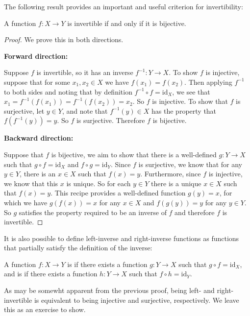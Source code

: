 The following result provides an important and useful criterion for invertibility:

\begin{theorem}
A function $f:X \to Y$ is invertible if and only if it is bijective.
\end{theorem}
\begin{proof}
We prove this in both directions.

\textbf{Forward direction:}

Suppose $f$ is invertible, so it has an inverse $f^{-1}: Y \to X$. To show $f$ is injective, suppose that for some $x_1, x_2 \in X$ we have $f(x_1) = f(x_2)$. Then applying $f^{-1}$ to both sides and noting that by definition $f^{-1} \circ f = \mathrm{id}_X$, we see that $x_1 = f^{-1}(f(x_1)) = f^{-1}(f(x_2)) = x_2$. So $f$ is injective. To show that $f$ is surjective, let $y \in Y$, and note that $f^{-1}(y) \in X$ has the property that $f(f^{-1}(y)) = y$. So $f$ is surjective. Therefore $f$ is bijective.

\textbf{Backward direction:}

Suppose that $f$ is bijective, we aim to show that there is a well-defined $g:Y \to X$ such that $g \circ f = \mathrm{id}_X$ and $f \circ g = \mathrm{id}_Y$. Since $f$ is surjective, we know that for any $y \in Y$, there is an $x \in X$ such that $f(x) = y$. Furthermore, since $f$ is injective, we know that this $x$ is unique. So for each $y \in Y$ there is a unique $x \in X$ such that $f(x) = y$. This recipe provides a well-defined function $g(y) = x$, for which we have $g(f(x)) = x$ for any $x \in X$ and $f(g(y)) = y$ for any $y \in Y$. So $g$ satisfies the property required to be an inverse of $f$ and therefore $f$ is invertible.
\end{proof}

It is also possible to define left-inverse and right-inverse functions as functions that partially satisfy the definition of the inverse:

\begin{definition}
A function $f:X \to Y$ is  if there exists a function $g:Y \to X$ such that $g \circ f = \mathrm{id}_X$, and is  if there exists a function $h: Y \to X$ such that $f \circ h = \mathrm{id}_Y$.
\end{definition}

As may be somewht apparent from the previous proof, being left- and right-invertible is equivalent to being injective and surjective, respectively. We leave this as an exercise to show.
\pagebreak

